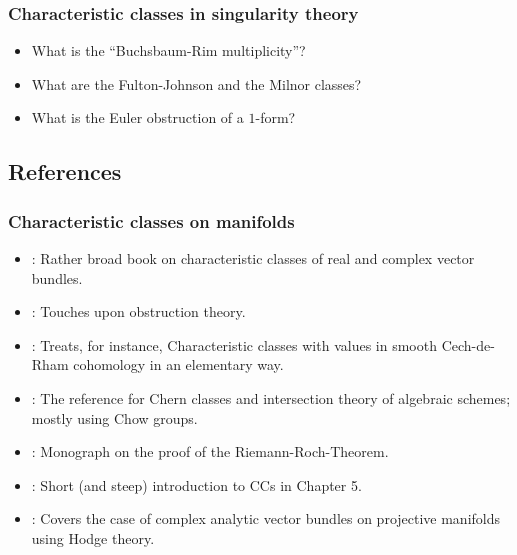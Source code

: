 \documentclass[a4paper]{article}
\begin{document}
\subsubsection*{Characteristic classes in singularity theory}
\begin{itemize}
  \item What is the ``Buchsbaum-Rim multiplicity''? 
  \item What are the Fulton-Johnson and the Milnor classes?
  \item What is the Euler obstruction of a $1$-form? 
\end{itemize}

\subsection*{References} 
\subsubsection*{Characteristic classes on manifolds}
\begin{itemize}
  \item \cite{MilnorStasheff74}: Rather broad book on characteristic classes of real and 
    complex vector bundles.
  \item \cite{Husemoeller94}: Touches upon obstruction theory. 
  \item \cite{BottTu82}: Treats, for instance, Characteristic classes with values in smooth Cech-de-Rham 
    cohomology in an elementary way.
  \item \cite{Fulton98}: The reference for Chern classes and intersection theory 
    of algebraic schemes; mostly using Chow groups.
  \item \cite{Hirzebruch66}: Monograph on the proof of the Riemann-Roch-Theorem.
  \item \cite{Stong68}: Short (and steep) introduction to CCs in Chapter 5.
  \item \cite{Atiyah56}: Covers the case of complex analytic vector bundles on 
    projective manifolds using Hodge theory.
\end{itemize}
\end{document}
